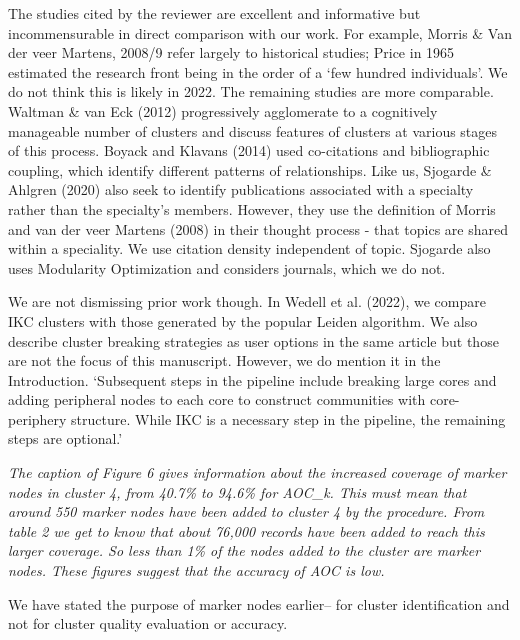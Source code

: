 \documentclass[11pt, oneside]{article}   	%
\begin{document}
The studies cited by the reviewer are excellent and informative but incommensurable in direct comparison with our work. For example, Morris \& Van der veer Martens, 2008/9 refer largely to historical studies; Price in 1965 estimated  the research front being in the order of a `few hundred individuals'. We do not think this is likely in 2022. The remaining studies are more comparable. Waltman \& van Eck (2012) progressively agglomerate to a cognitively manageable number of clusters and discuss features of clusters at various stages of this process. Boyack and Klavans (2014) used co-citations and bibliographic coupling, which identify different patterns of relationships. Like us, Sjogarde \& Ahlgren (2020) also seek to identify publications associated with a specialty rather than the specialty's members. However, they use the definition of Morris and van der veer Martens (2008) in their thought process - that topics are shared within a speciality. We use citation density independent of topic. Sjogarde also uses Modularity Optimization and considers journals, which we do not.

We are not dismissing prior work though. In Wedell et al. (2022), we compare IKC clusters with those generated by the popular Leiden algorithm. We also describe cluster breaking strategies as user options in the same article but those are not the focus of this manuscript. However, we do mention it in the Introduction. `Subsequent steps in the pipeline include breaking large cores and adding peripheral nodes to each core to construct communities with core-periphery structure. While IKC is a necessary step in the pipeline, the remaining steps are optional.'

\vspace{2 mm} 
 \emph{The caption of Figure 6 gives information about the increased coverage of marker nodes in cluster 4, from 40.7\% to 94.6\% for AOC\_k. This must mean that around 550 marker nodes have been added to cluster 4 by the procedure. From table 2 we get to know that about 76,000 records have been added to reach this larger coverage. So less than 1\% of the nodes added to the cluster are marker nodes. These figures suggest that the accuracy of AOC is low.}
\vspace{2 mm} 

\vspace{2 mm} 
We have stated the purpose of marker nodes earlier-- for cluster identification and not for cluster quality evaluation or accuracy.
\end{document}
